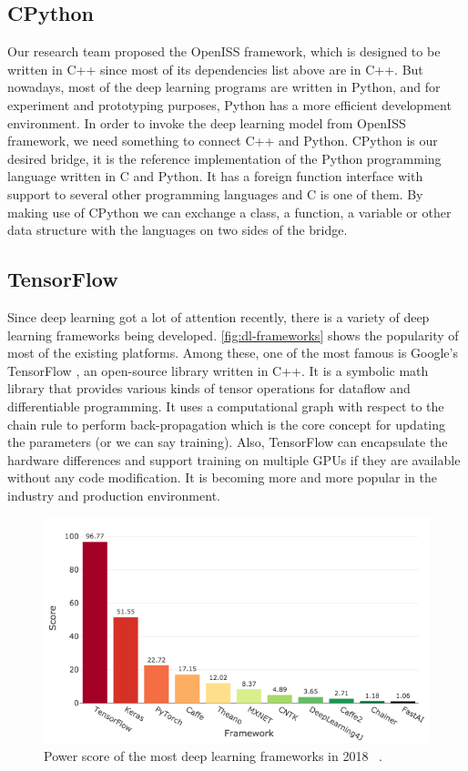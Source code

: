 \subsection{CPython}
\label{sec:related_work_cpython}

Our research team proposed the OpenISS framework, which is designed to be written in C++ since most of
its dependencies list above are in C++. But nowadays, most of the deep learning
programs are written in Python, and for experiment and prototyping purposes,
Python has a more efficient development environment. In order to invoke the
deep learning model from OpenISS framework, we need something to connect C++
and Python. CPython is our desired bridge, it is the reference implementation
of the Python programming language written in C and Python. It has a foreign
function interface with support to several other programming languages and C is
one of them. By making use of CPython we can exchange a class, a function, a
variable or other data structure with the languages on two sides of the bridge.

\subsection{TensorFlow}
\label{sec:related_work_openiss_tf}

Since deep learning got a lot of attention recently, there is a variety of deep learning
frameworks being developed. \autoref{fig:dl-frameworks} shows the popularity of
most of the existing platforms. Among these, one of the most famous is Google's 
TensorFlow \cite{tensorflow2015-whitepaper}, an open-source library written in C++. 
It is a symbolic math library that provides various kinds of
tensor operations for dataflow and differentiable programming. It uses
a computational graph with respect to the chain rule to perform
back-propagation which is the core concept for updating the parameters (or we
can say training). Also, TensorFlow can encapsulate the hardware differences and
support training on multiple GPUs if they are available without any code
modification. It is becoming more and more popular in the industry and production
environment.

\begin{figure}
    \includegraphics[width=\linewidth]{figures/dl_framework.png}
    \caption{Power score of the most deep learning frameworks in 2018
        ~\protect \cite{score-dl-framework}.}
    \label{fig:dl-frameworks}
\end{figure}


